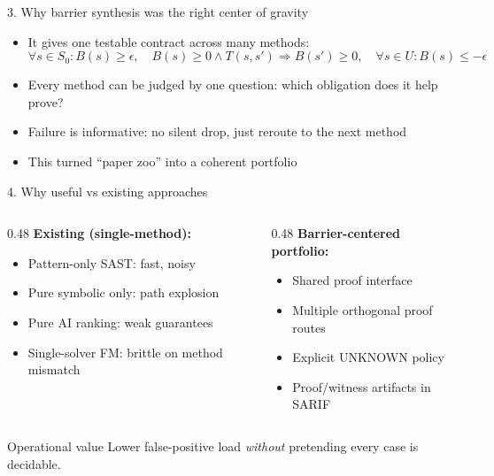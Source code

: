 \documentclass[aspectratio=169]{beamer}
\begin{document}
\begin{frame}{3. Why barrier synthesis was the right center of gravity}
\begin{itemize}
  \item It gives one testable contract across many methods:
  \[
  \forall s\in S_0: B(s)\ge\epsilon,\quad
  B(s)\ge0 \wedge T(s,s')\Rightarrow B(s')\ge0,\quad
  \forall s\in U: B(s)\le-\epsilon
  \]
  \item Every method can be judged by one question: which obligation does it help prove?
  \item Failure is informative: no silent drop, just reroute to the next method
  \item This turned ``paper zoo'' into a coherent portfolio
\end{itemize}
\end{frame}

\begin{frame}{4. Why useful vs existing approaches}
\begin{columns}
\begin{column}{0.48\textwidth}
\textbf{Existing (single-method):}
\begin{itemize}
  \item Pattern-only SAST: fast, noisy
  \item Pure symbolic only: path explosion
  \item Pure AI ranking: weak guarantees
  \item Single-solver FM: brittle on method mismatch
\end{itemize}
\end{column}
\begin{column}{0.48\textwidth}
\textbf{Barrier-centered portfolio:}
\begin{itemize}
  \item Shared proof interface
  \item Multiple orthogonal proof routes
  \item Explicit UNKNOWN policy
  \item Proof/witness artifacts in SARIF
\end{itemize}
\end{column}
\end{columns}
\vspace{0.3em}
\begin{block}{Operational value}
Lower false-positive load \emph{without} pretending every case is decidable.
\end{block}
\end{frame}
\end{document}
